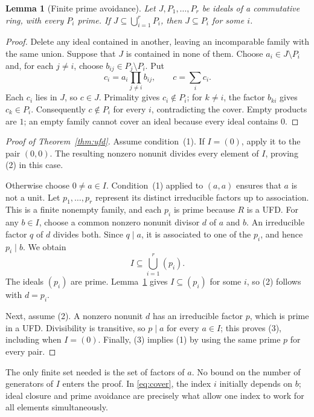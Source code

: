 \documentclass[11pt]{article}
\newtheorem{lemma}[theorem]{Lemma}
\theoremstyle{remark}
\begin{document}
\begin{lemma}[Finite prime avoidance]\label{lem:avoidance}
Let $J,P_1,\ldots,P_r$ be ideals of a commutative ring, with every
$P_i$ prime. If $J\subseteq\bigcup_{i=1}^r P_i$, then
$J\subseteq P_i$ for some $i$.
\end{lemma}

\begin{proof}
Delete any ideal contained in another, leaving an incomparable family
with the same union. Suppose that $J$ is contained in none of them.
Choose $a_i\in J\setminus P_i$ and, for each $j\ne i$, choose
$b_{ij}\in P_j\setminus P_i$. Put
\[
  c_i=a_i\prod_{j\ne i}b_{ij},\qquad c=\sum_i c_i.
\]
Each $c_i$ lies in $J$, so $c\in J$. Primality gives $c_i\notin P_i$;
for $k\ne i$, the factor $b_{ki}$ gives $c_k\in P_i$. Consequently
$c\notin P_i$ for every $i$, contradicting the cover. Empty products
are $1$; an empty family cannot cover an ideal because every ideal
contains $0$.
\end{proof}

\begin{proof}[Proof of Theorem~\ref{thm:ufd}]
Assume condition~(1). If $I=(0)$, apply it to the pair $(0,0)$.
The resulting nonzero nonunit divides every element of $I$, proving
(2) in this case.

Otherwise choose $0\ne a\in I$. Condition~(1) applied to $(a,a)$
ensures that $a$ is not a unit. Let $p_1,\ldots,p_r$ represent its
distinct irreducible factors up to association. This is a finite
nonempty family, and each $p_i$ is prime because $R$ is a UFD.
For any $b\in I$, choose a common nonzero nonunit divisor $d$ of $a$
and $b$. An irreducible factor $q$ of $d$ divides both. Since $q\mid a$,
it is associated to one of the $p_i$, and hence $p_i\mid b$. We obtain
\begin{equation}\label{eq:cover}
  I\subseteq \bigcup_{i=1}^r(p_i).
\end{equation}
The ideals $(p_i)$ are prime. Lemma~\ref{lem:avoidance} gives
$I\subseteq(p_i)$ for some $i$, so (2) follows with $d=p_i$.

Next, assume (2). A nonzero nonunit $d$ has an irreducible factor
$p$, which is prime in a UFD. Divisibility is transitive, so
$p\mid a$ for every $a\in I$; this proves (3), including when $I=(0)$.
Finally, (3) implies (1) by using the same prime $p$ for every pair.
\end{proof}

The only finite set needed is the set of factors of $a$. No bound on
the number of generators of $I$ enters the proof. In
\eqref{eq:cover}, the index $i$ initially depends on $b$; ideal closure
and prime avoidance are precisely what allow one index to work for
all elements simultaneously.
\end{document}

